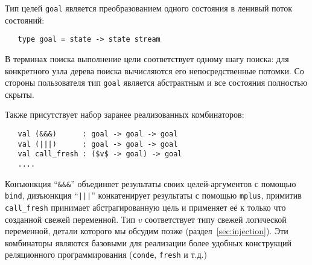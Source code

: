 

Тип целей \lstinline|goal| является преобразованием одного состояния в ленивый поток состояний:

\begin{lstlisting}
   type goal = state -> state stream
\end{lstlisting}

\noindent В терминах поиска выполнение цели соответствует одному шагу поиска: для конкретного узла дерева поиска вычисляются его непосредственные потомки.
Со стороны пользователя тип \lstinline|goal| является абстрактным и все состояния полностью скрыты.

Также присутствует набор заранее реализованных комбинаторов:

\begin{lstlisting}
   val (&&&)      : goal -> goal -> goal
   val (|||)      : goal -> goal -> goal
   val call_fresh : ($v$ -> goal) -> goal
   ....
\end{lstlisting}

Конъюнкция \enquote{\lstinline=&&&=} объединяет результаты своих целей-аргументов с помощью \lstinline|bind|,
дизъюнкция \enquote{\lstinline=|||=} конкатенирует результаты с помощью \lstinline|mplus|,
примитив \lstinline|call_fresh| принимает абстрагированную цель и применяет её к только что созданной свежей переменной.
Тип $v$ соответствует типу свежей логической переменной, детали которого мы обсудим позже (раздел~\ref{sec:injection}).
Эти комбинаторы являются базовыми для реализации более удобных конструкций реляционного программирования (\lstinline|conde|, \lstinline|fresh| и т.д.)

